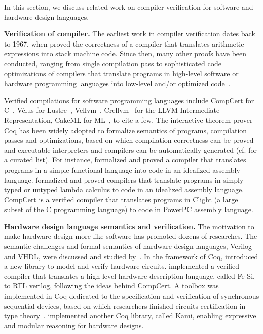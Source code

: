
In this section, we discuss related work on compiler verification for software and hardware design languages. 

\noindent\textbf{Verification of compiler.} The earliest work in compiler verification dates back to 1967,
when \cite{MP67} proved the correctness of a compiler that translates
arithmetic expressions into stack
machine code. Since then, many other proofs have been conducted, ranging from
single compilation pass to sophisticated code optimizations of compilers
that translate programs in high-level software or hardware programming languages into low-level and/or optimized code~\cite{Dave03}.
 
Verified compilations for software programming languages
include CompCert for C~\cite{Leroy09,kastner2018compcert,Leroy2006,Leroy-BKSPF-2016,BlazyDL06,Kastner-LBSSF-2017},
V\'{e}lus for Lustre~\cite{BourkeBDLPR17}, Vellvm~\cite{ZhaoNMZ12,ZhaoNMZ13}, Crellvm~\cite{KangKSLPSKCCHY18} for the LLVM Intermediate Representation,
CakeML for ML~\cite{KumarMNO14,LoowKTMNAF19,TanMKFON19,OwensNKMT17}, to cite a few.
The interactive theorem prover Coq has been widely adopted to formalize semantics of programs,
compilation passes and optimizations, based on which compilation correctness can be proved and
executable interpreters and compilers can be automatically generated (cf. \cite{Awesomecoq} for a curated list).
For instance, \cite{benton2009} formalized and proved a compiler that translates programs in a simple functional language into code in an idealized assembly language.
\cite{Chlipala07,Chlipala10} formalized and proved compilers that translate programs in simply-typed or untyped lambda calculus to code in an idealized assembly language.
CompCert is a verified compiler that translates programs in Clight (a large subset of the C programming
language) to code in PowerPC assembly language.

\smallskip 
\noindent\textbf{Hardware design language semantics and verification.}
The motivation to make hardware design more like software has promoted dozens of researches.
The semantic challenges and formal semantics of hardware design languages, Verilog and VHDL, were discussed and studied by~\cite{Gordon95,Kloos1995FormalSF}. In the framework of Coq, 
\cite{Braibant11} introduced a new library to model and verify hardware circuits.
\cite{Braibant13} implemented a verified compiler that translates a high-level hardware description language, called Fe-Si, to RTL verilog,
following the ideas behind CompCert.
A toolbox was implemented in Coq dedicated to the specification and verification of synchronous sequential devices, based on which researchers finished circuits certification in type theory~\cite{Coupet04}.
\cite{ChoiACM17} implemented another Coq library, called Kami, enabling expressive and modular reasoning for hardware designs.



